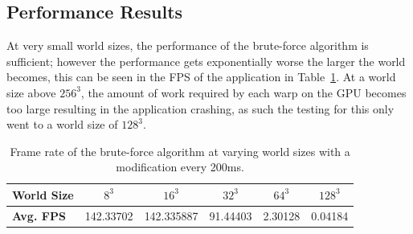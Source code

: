 \subsection{Performance Results}
At very small world sizes, the performance of the brute-force algorithm is sufficient; however the performance gets
exponentially worse the larger the world becomes, this can be seen in the FPS of the application in
Table~\ref{tab:brute_force_fps}. At a world size above \(256^3\), the amount of work required by each warp on the GPU
becomes too large resulting in the application crashing, as such the testing for this only went to a world size of
\(128^3\).

\begin{table}[h]
    \centering
    \vspace{0.5em}
    \begin{tabular}{l|*{5}{c}}
        \toprule
        \textbf{World Size} & \textbf{\(8^3\)} & \textbf{\(16^3\)} & \textbf{\(32^3\)} & \textbf{\(64^3\)} & \textbf{\(128^3\)} \\
        \midrule
        \textbf{Avg. FPS}   & 142.33702        & 142.335887        & 91.44403          & 2.30128           & 0.04184            \\
        \bottomrule
    \end{tabular}
    \caption{Frame rate of the brute-force algorithm at varying world sizes with a modification every 200ms.}
    \label{tab:brute_force_fps}
\end{table}

\begin{table}[h]
    \centering
    \vspace{0.5em}
    \caption{Distance field compute shader execution time using the brute-force algorithm.}
    \label{tab:brute_force}
\end{table}

